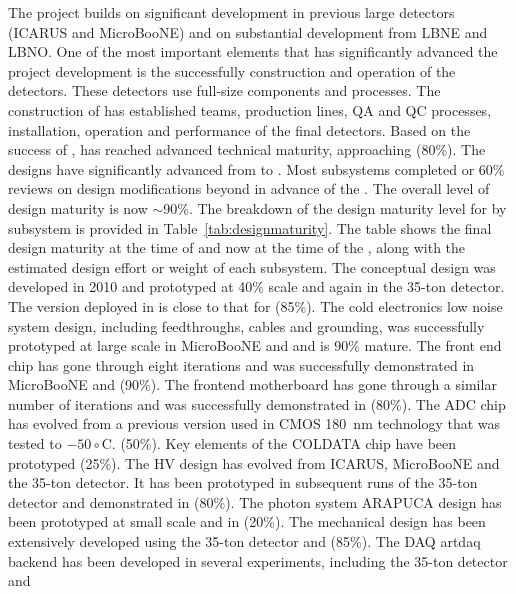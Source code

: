 The  project builds on significant development in previous
large  detectors (ICARUS and MicroBooNE) and on
substantial development from LBNE and LBNO. One of the most important
elements that has significantly advanced the project development is
the successfully construction and operation of the 
detectors. These detectors use full-size  components and
processes. The construction of  has established
teams, production lines, QA and QC processes, installation, operation
and performance of the final  detectors. Based on the
success of ,  has reached advanced technical
maturity, approaching (80\%). The designs have significantly advanced
from  to . Most subsystems completed
 or 60\% reviews on design modifications beyond
 in advance of the . The overall level of
design maturity is now $\sim$90\%. The breakdown of the design maturity
level for  by subsystem is provided in
Table~\ref{tab:designmaturity}. The table shows the final 
design maturity at the time of  and now at the time
of the , along with the estimated design effort or weight
of each subsystem. The  conceptual design was developed in
2010 and prototyped at 40\% scale and again in the 35-ton detector. The version
deployed in  is close to that for  (85\%). The
cold electronics low noise system design, including feedthroughs,
cables and grounding, was successfully prototyped at large scale in
MicroBooNE and  and is 90\% mature. The front end chip has
gone through eight iterations and was successfully demonstrated in
MicroBooNE and  (90\%). The frontend motherboard has gone
through a similar number of iterations and was successfully
demonstrated in  (80\%). The ADC chip has evolved from a
previous version used in CMOS 180~nm technology that was tested to $-50\circ$C. (50\%). Key
elements of the COLDATA chip have been prototyped (25\%). The HV
design has evolved from ICARUS, MicroBooNE and the 35-ton detector.  It
has been prototyped in subsequent runs of the 35-ton detector and
demonstrated in  (80\%). The photon system ARAPUCA design
has been prototyped at small scale and in  (20\%). The
mechanical design has been extensively developed using the 35-ton
detector and  (85\%). The DAQ artdaq backend has been
developed in several experiments, including the 35-ton detector and
